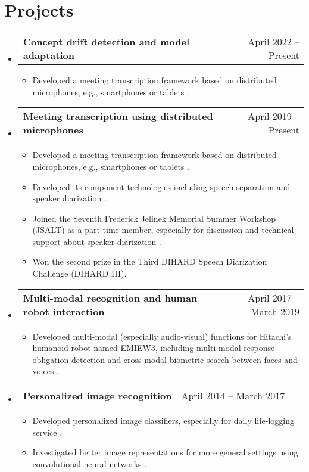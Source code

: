 \documentclass[letterpaper,11pt]{article}
\makeatletter
\newcommand{\resumeItem}[1]{
  \item\small{
    {#1 \vspace{-2pt}}
  }
}
\newcommand{\resumeProjectHeading}[2]{
    \item
    \begin{tabular*}{0.97\textwidth}{l@{\extracolsep{\fill}}r}
      \small#1 & #2 \\
    \end{tabular*}\vspace{-7pt}
}
\newcommand{\resumeSubHeadingListStart}{\begin{itemize}[leftmargin=0.15in, label={}]}
\newcommand{\resumeSubHeadingListEnd}{\end{itemize}}
\newcommand{\resumeItemListStart}{\begin{itemize}}
\newcommand{\resumeItemListEnd}{\end{itemize}\vspace{-5pt}}
\makeatother
\begin{document}
\section{Projects}
    \resumeSubHeadingListStart
      \resumeProjectHeading
          {\textbf{Concept drift detection and model adaptation}}{April 2022 -- Present}
          \resumeItemListStart
            \resumeItem{Developed a meeting transcription framework based on distributed microphones, e.g., smartphones or tablets \cite{horiguchi2020utterancewise}.}
          \resumeItemListEnd
      \resumeProjectHeading
          {\textbf{Meeting transcription using distributed microphones}}{April 2019 -- Present}
          \resumeItemListStart
            \resumeItem{Developed a meeting transcription framework based on distributed microphones, e.g., smartphones or tablets \cite{horiguchi2020utterancewise}.}
            \resumeItem{Developed its component technologies including speech separation \cite{horiguchi2021blockonline} and speaker diarization \cite{horiguchi2022multichannel,horiguchi2021towards,horiguchi2020endtoend,horiguchi2021endtoend}.}
            \resumeItem{Joined the Seventh Frederick Jelinek Memorial Summer Workshop (JSALT) as a part-time member, especially for discussion and technical support about speaker diarization \cite{horiguchi2021endtoend}.}
            \resumeItem{Won the second prize in the Third DIHARD Speech Diarization Challenge (DIHARD III).}
          \resumeItemListEnd
      \resumeProjectHeading
          {\textbf{Multi-modal recognition and human robot interaction}}{April 2017 -- March 2019}
          \resumeItemListStart
            \resumeItem{Developed multi-modal (especially audio-visual) functions for Hitachi's humanoid robot named EMIEW3, including multi-modal response obligation detection \cite{horiguchi2019multimodal} and cross-modal biometric search between faces and voices \cite{horiguchi2018facevoice}.}
          \resumeItemListEnd
      \resumeProjectHeading
          {\textbf{Personalized image recognition}}{April 2014 -- March 2017}
          \resumeItemListStart
            \resumeItem{Developed personalized image classifiers, especially for daily life-logging service \cite{horiguchi2018personalized}.}
            \resumeItem{Investigated better image representations for more general settings using convolutional neural networks \cite{horiguchi2020significance}.}
          \resumeItemListEnd
    \resumeSubHeadingListEnd
\end{document}
